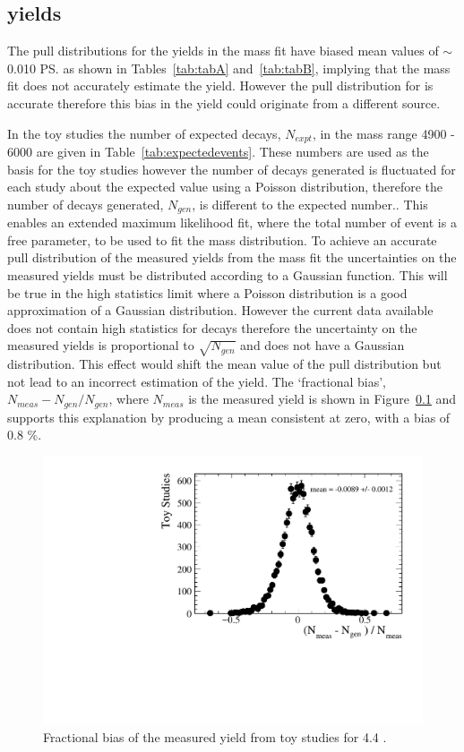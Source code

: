 \subsection{\bsmumu yields}
The pull distributions for the \bsmumu yields in the mass fit have biased mean values of $\sim$ 0.010 \ps as shown in Tables~\ref{tab:tabA} and~\ref{tab:tabB}, implying that the mass fit does not accurately estimate the \bsmumu yield. However the pull distribution for \Gmumu is accurate therefore this bias in the \bsmumu yield could originate from a different source.

In the toy studies the number of expected decays, $N_{expt}$, in the mass range 4900 - 6000 \mevcc are given in Table~\ref{tab:expectedevents}. These numbers are used as the basis for the toy studies however the number of decays generated is fluctuated for each study about the expected value using a Poisson distribution, therefore the number of decays generated, $N_{gen}$, is different to the expected number.. This enables an extended maximum likelihood fit, where the total number of event is a free parameter, to be used to fit the mass distribution. To achieve an accurate pull distribution of the measured \bsmumu yields from the mass fit the uncertainties on the measured yields must be distributed according to a Gaussian function. This will be true in the high statistics limit where a Poisson distribution is a good approximation of a Gaussian distribution. However the current data available does not contain high statistics for \bsmumu decays therefore the uncertainty on the measured yields is proportional to $\sqrt{N_{gen}}$ and does not have a Gaussian distribution. This effect would shift the mean value of the pull distribution but not lead to an incorrect estimation of the \bsmumu yield. The `fractional bias', $N_{meas} - N_{gen}/N_{gen}$, where $N_{meas}$ is the measured \bsmumu yield is shown in Figure~\ref{} and supports this explanation by producing a mean consistent at zero, with a bias of 0.8 $\%$. 

\begin{figure}[htbp]
    \centering
        \includegraphics[width=0.6 \textwidth]{./Figs/LifetimeSystematics/Fractional_bias_Bsmumu_yield_CKM.pdf}
    \caption{Fractional bias of the measured \bsmumu yield from toy studies for 4.4 \fb.}
    \label{fig:FracBias}
\end{figure}


